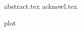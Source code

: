 \documentclass[
12pt, %
\if\OneSided1
oneside,
\fi %
russian, english,
singlespacing, %
headsepline, %
]{thesis} %
\begin{document}
\dominitoc[n]



\frontmatter %
\pagestyle{plain}

\if{}



{abstract.tex}
{acknowl.tex}
\fi

\setcounter{tocdepth}{1} %
\tableofcontents %




\mainmatter %
\pagestyle{thesis}

\if{}
\setcounter{mtc}{0} %
\fi
\if{}
\setcounter{mtc}{2} %
\fi

{plot}

\end{document}
